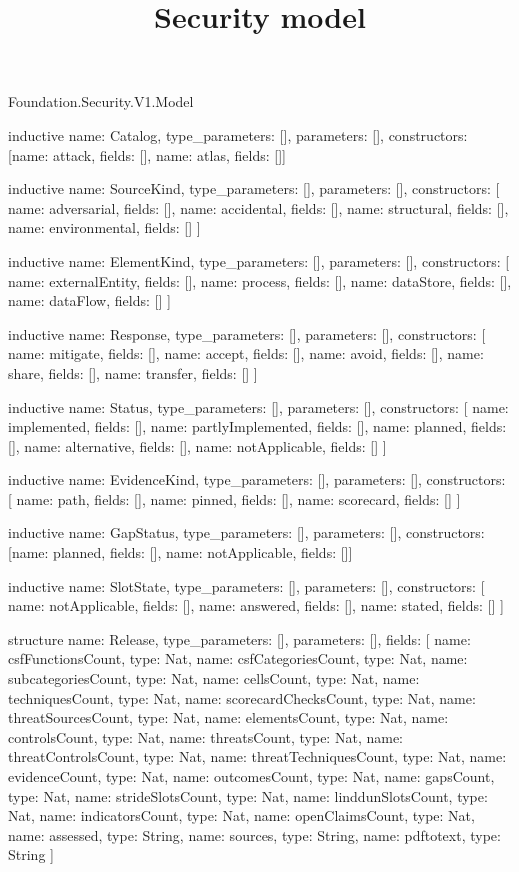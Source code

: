 \begin{lexlean}{Foundation.Security.V1.Model}
\title{Security model}
\begin{semanticmodule}
inductive{
  name: Catalog,
  type_parameters: [],
  parameters: [],
  constructors: [{name: attack, fields: []}, {name: atlas, fields: []}]
}

inductive{
  name: SourceKind,
  type_parameters: [],
  parameters: [],
  constructors: [
    {name: adversarial, fields: []},
    {name: accidental, fields: []},
    {name: structural, fields: []},
    {name: environmental, fields: []}
  ]
}

inductive{
  name: ElementKind,
  type_parameters: [],
  parameters: [],
  constructors: [
    {name: externalEntity, fields: []},
    {name: process, fields: []},
    {name: dataStore, fields: []},
    {name: dataFlow, fields: []}
  ]
}

inductive{
  name: Response,
  type_parameters: [],
  parameters: [],
  constructors: [
    {name: mitigate, fields: []},
    {name: accept, fields: []},
    {name: avoid, fields: []},
    {name: share, fields: []},
    {name: transfer, fields: []}
  ]
}

inductive{
  name: Status,
  type_parameters: [],
  parameters: [],
  constructors: [
    {name: implemented, fields: []},
    {name: partlyImplemented, fields: []},
    {name: planned, fields: []},
    {name: alternative, fields: []},
    {name: notApplicable, fields: []}
  ]
}

inductive{
  name: EvidenceKind,
  type_parameters: [],
  parameters: [],
  constructors: [
    {name: path, fields: []},
    {name: pinned, fields: []},
    {name: scorecard, fields: []}
  ]
}

inductive{
  name: GapStatus,
  type_parameters: [],
  parameters: [],
  constructors: [{name: planned, fields: []}, {name: notApplicable, fields: []}]
}

inductive{
  name: SlotState,
  type_parameters: [],
  parameters: [],
  constructors: [
    {name: notApplicable, fields: []},
    {name: answered, fields: []},
    {name: stated, fields: []}
  ]
}

structure{
  name: Release,
  type_parameters: [],
  parameters: [],
  fields: [
    {name: csfFunctionsCount, type: Nat},
    {name: csfCategoriesCount, type: Nat},
    {name: subcategoriesCount, type: Nat},
    {name: cellsCount, type: Nat},
    {name: techniquesCount, type: Nat},
    {name: scorecardChecksCount, type: Nat},
    {name: threatSourcesCount, type: Nat},
    {name: elementsCount, type: Nat},
    {name: controlsCount, type: Nat},
    {name: threatsCount, type: Nat},
    {name: threatControlsCount, type: Nat},
    {name: threatTechniquesCount, type: Nat},
    {name: evidenceCount, type: Nat},
    {name: outcomesCount, type: Nat},
    {name: gapsCount, type: Nat},
    {name: strideSlotsCount, type: Nat},
    {name: linddunSlotsCount, type: Nat},
    {name: indicatorsCount, type: Nat},
    {name: openClaimsCount, type: Nat},
    {name: assessed, type: String},
    {name: sources, type: String},
    {name: pdftotext, type: String}
  ]
}


\end{semanticmodule}
\end{lexlean}
